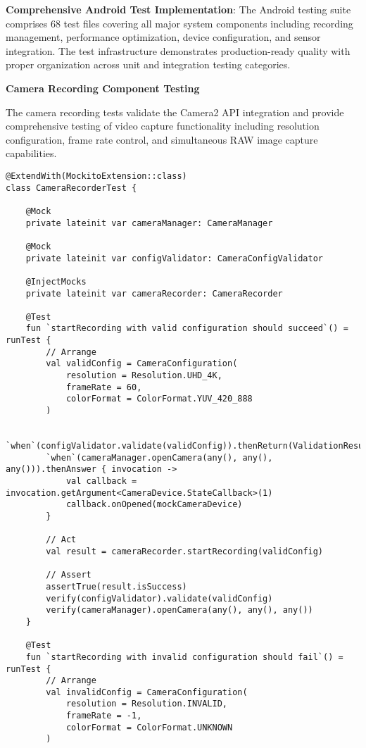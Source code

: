 \documentclass[12pt,a4paper]{article}
\begin{document}
\textbf{Comprehensive Android Test Implementation}: The Android testing suite comprises 68 test files covering all major 
system components including recording management, performance optimization, device configuration, and sensor integration. 
The test infrastructure demonstrates production-ready quality with proper organization across unit and integration 
testing categories.

\textbf{Camera Recording Component Testing}

The camera recording tests validate the Camera2 API integration and provide comprehensive testing of video capture
functionality including resolution configuration, frame rate control, and simultaneous RAW image capture capabilities.

\begin{verbatim}
@ExtendWith(MockitoExtension::class)
class CameraRecorderTest {
    
    @Mock
    private lateinit var cameraManager: CameraManager
    
    @Mock
    private lateinit var configValidator: CameraConfigValidator
    
    @InjectMocks
    private lateinit var cameraRecorder: CameraRecorder
    
    @Test
    fun `startRecording with valid configuration should succeed`() = runTest {
        // Arrange
        val validConfig = CameraConfiguration(
            resolution = Resolution.UHD_4K,
            frameRate = 60,
            colorFormat = ColorFormat.YUV_420_888
        )
        
        `when`(configValidator.validate(validConfig)).thenReturn(ValidationResult.success())
        `when`(cameraManager.openCamera(any(), any(), any())).thenAnswer { invocation ->
            val callback = invocation.getArgument<CameraDevice.StateCallback>(1)
            callback.onOpened(mockCameraDevice)
        }
        
        // Act
        val result = cameraRecorder.startRecording(validConfig)
        
        // Assert
        assertTrue(result.isSuccess)
        verify(configValidator).validate(validConfig)
        verify(cameraManager).openCamera(any(), any(), any())
    }
    
    @Test
    fun `startRecording with invalid configuration should fail`() = runTest {
        // Arrange
        val invalidConfig = CameraConfiguration(
            resolution = Resolution.INVALID,
            frameRate = -1,
            colorFormat = ColorFormat.UNKNOWN
        )
        

\end{verbatim}
\end{document}
